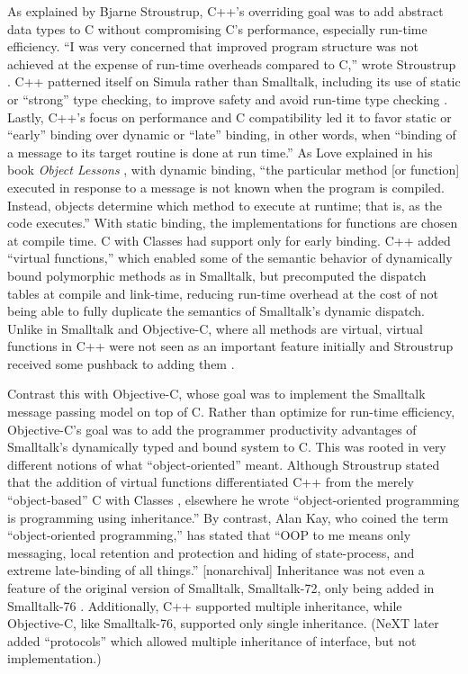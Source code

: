 \documentclass[acmsmall]{acmart}\settopmatter{}
\begin{document}
As explained by Bjarne Stroustrup, C++'s overriding goal was to add abstract data types to C without compromising C's performance, especially run-time efficiency. ``I was very concerned that improved program structure was not achieved at the expense of run-time overheads compared to C,'' wrote Stroustrup \citetext{\citeyear[5]{stroustrup_history_1993}}. C++ patterned itself on Simula rather than Smalltalk, including its use of static or ``strong'' type checking, to improve safety and avoid run-time type checking \citep[30--31]{stroustrup_history_1993}. Lastly, C++'s focus on performance and C compatibility led it to favor static or ``early'' binding over dynamic or ``late'' binding, in other words, when ``binding of a message to its target routine is done at run time.'' \citep[15]{cox_object_1983} As Love explained in his book \emph{Object Lessons} \citep[29]{love_object_1995}, with dynamic binding, ``the particular method [or function] executed in response to a message is not known when the program is compiled. Instead, objects determine which method to execute at runtime; that is, as the code executes.'' With static binding, the implementations for functions are chosen at compile time. C with Classes had support only for early binding. C++ added ``virtual functions,'' which enabled some of the semantic behavior of dynamically bound polymorphic methods as in Smalltalk, but precomputed the dispatch tables at compile and link-time, reducing run-time overhead at the cost of not being able to fully duplicate the semantics of Smalltalk's dynamic dispatch. Unlike in Smalltalk and Objective-C, where all methods are virtual, virtual functions in C++ were not seen as an important feature initially and Stroustrup received some pushback to adding them  \citep[23]{stroustrup_history_1993}.

Contrast this with Objective-C, whose goal was to implement the Smalltalk message passing model on top of C. Rather than optimize for run-time efficiency, Objective-C's goal was to add the programmer productivity advantages of Smalltalk's dynamically typed and bound system to C. This was rooted in very different notions of what ``object-oriented'' meant. Although Stroustrup stated that the addition of virtual functions differentiated C++ from the merely ``object-based'' C with Classes \citep[22]{stroustrup_history_1993}, elsewhere he wrote ``object-oriented programming is programming using inheritance.'' \citep[30]{stroustrup_history_1993} By contrast, Alan Kay, who coined the term ``object-oriented programming,'' has stated that ``OOP to me means only messaging, local retention and protection and hiding of state-process, and extreme late-binding of all things.'' \citep{ram_dr._2003} [nonarchival] Inheritance was not even a feature of the original version of Smalltalk, Smalltalk-72, only being added in Smalltalk-76 \citep[31]{kay_early_1993}. Additionally, C++ supported multiple inheritance, while Objective-C, like Smalltalk-76, supported only single inheritance. (NeXT later added ``protocols'' which allowed multiple inheritance of interface, but not implementation.)
\end{document}
